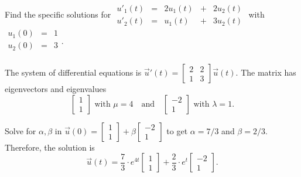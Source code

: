 \documentclass[../main.tex]{subfiles}
\begin{document}
\begin{exercise}
  Find the specific solutions for
  \(
  \begin{array}{rcrcr}
    u'_{1}(t) &=& 2 u_{1}(t) &+& 2u_{2}(t) \\
    u'_{2}(t) &=&   u_{1}(t) &+& 3u_{2}(t)
  \end{array}
  \) with \(
  \begin{array}{rcr}
    u_{1}(0) &=&  1 \\
    u_{2}(0) &=&  3 \\
  \end{array}
  \).

  \begin{solution}
    The system of differential equations is \(\vec{u}'(t) = \begin{bmatrix} 2 & 2 \\ 1 & 3 \end{bmatrix} \vec{u}(t)\). The matrix has eigenvectors and eigenvalues
    \[
      \begin{bmatrix}
        1 \\
        1
      \end{bmatrix}
      \text{ with \(\mu = 4\)}
      \quad\text{and}\quad
      \begin{bmatrix}
        -2 \\
        1
      \end{bmatrix}
      \text{ with \(\lambda = 1\)}.
    \]

    Solve for \(\alpha,\beta\) in \(\vec{u}(0) = \begin{bmatrix} 1 \\ 1 \end{bmatrix} + \beta \begin{bmatrix} -2 \\ 1 \end{bmatrix}\) to get \(\alpha = 7/3\) and \(\beta = 2/3\).  Therefore, the solution is
    \[
      \vec{u}(t) = 
      \frac{7}{3} \cdot e^{4t} 
      \begin{bmatrix}
        1 \\
        1
      \end{bmatrix}
      +
      \frac{2}{3} \cdot e^{t} 
      \begin{bmatrix}
        -2 \\
        1
      \end{bmatrix}.
    \]

  \end{solution}
\end{exercise}
\end{document}
